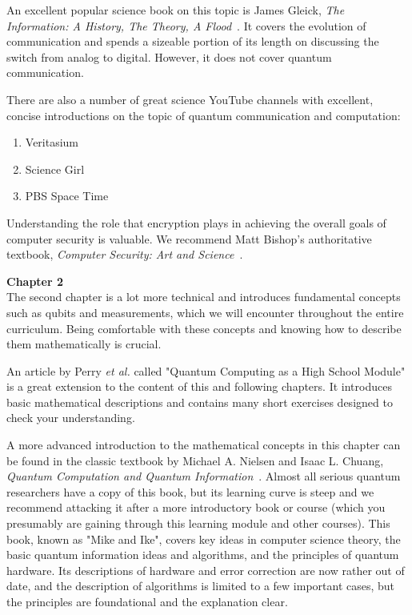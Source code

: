 An excellent popular science book on this topic is James Gleick, \emph{The Information: A History, The Theory, A Flood}~\cite{gleick2012information}. It covers the evolution of communication and spends a sizeable portion of its length on discussing the switch from analog to digital. However, it does not cover quantum communication.

There are also a number of great science YouTube channels with excellent, concise introductions on the topic of quantum communication and computation:
\begin{enumerate}
    \item Veritasium
    \item Science Girl
    \item PBS Space Time
\end{enumerate}

Understanding the role that encryption plays in achieving the overall goals of computer security is valuable. We recommend Matt Bishop's authoritative textbook, \emph{Computer Security: Art and Science}~\cite{bishop2002art}.

{\bf Chapter 2}\\

The second chapter is a lot more technical and introduces fundamental concepts such as qubits and measurements, which we will encounter throughout the entire curriculum. Being comfortable with these concepts and knowing how to describe them mathematically is crucial.

An article by Perry \emph{et al.} called "Quantum Computing as a High School Module" is a great extension to the content of this and following chapters. It introduces basic mathematical descriptions and contains many short exercises designed to check your understanding.

A more advanced introduction to the mathematical concepts in this chapter can be found in the classic textbook by Michael A. Nielsen and Isaac L. Chuang, \emph{Quantum Computation and Quantum Information}~\cite{nielsen-chuang:qci}. Almost all serious quantum researchers have a copy of this book, but its learning curve is steep and we recommend attacking it after a more introductory book or course (which you presumably are gaining through this learning module and other courses). This book, known as "Mike and Ike", covers key ideas in computer science theory, the basic quantum information ideas and algorithms, and the principles of quantum hardware. Its descriptions of hardware and error correction are now rather out of date, and the description of algorithms is limited to a few important cases, but the principles are foundational and the explanation clear.


